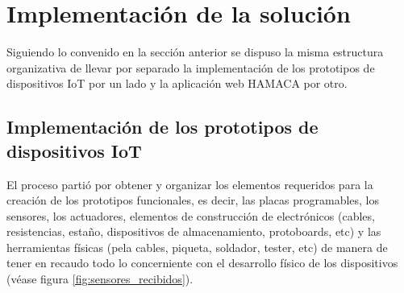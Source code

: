 \section{Implementación de la solución}
Siguiendo lo convenido en la sección anterior se dispuso la misma estructura organizativa de llevar por separado la implementación de los prototipos de dispositivos IoT por un lado y la aplicación web HAMACA por otro.\\

\subsection{Implementación de los prototipos de dispositivos IoT}
El proceso partió por obtener y organizar los elementos requeridos para la creación de los prototipos funcionales, es decir, las placas programables, los sensores, los actuadores, elementos de construcción de electrónicos (cables, resistencias, estaño, dispositivos de almacenamiento, protoboards, etc) y las herramientas físicas (pela cables, piqueta, soldador, tester, etc)  de manera de tener en recaudo todo lo concerniente con el desarrollo físico de los dispositivos (véase figura \ref{fig:sensores_recibidos}).

